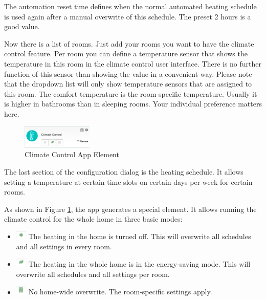 The automation reset time defines when the normal automated heating schedule is used 
again after a manual overwrite of this schedule. The preset 2 hours is a good value.

Now there is a list of rooms. Just add your rooms you want to have the climate control 
feature. Per room you can define a temperature sensor that shows the temperature in this 
room in the climate control user interface. There is no further function of this sensor 
than showing the value in a convenient way. Please note that the dropdown list will 
only show temperature sensors that are assigned to this room. The comfort temperature 
is the room-specific temperature. Usually it is higher in bathrooms than in sleeping 
rooms. Your individual preference matters here.


\begin{figure}
\begin{center}
\includegraphics[width=0.3\textwidth]{pngs/cap6/app27.png}
\caption{Climate Control App Element}
\label{app27}
\end{center}
\end{figure}

The last section of the configuration dialog is the heating schedule. It allows setting a 
temperature at certain time slots on certain days per week for certain rooms.

As shown in Figure \ref{app27}, the app generates a special element. It allows running the 
climate control for the whole home in three basic modes:

\begin{itemize}
\item \includegraphics[width=0.04\textwidth]{pngs/cap6/app27a.png} The heating in the home 
is turned off. This will overwrite all schedules and all settings in every room.
\item \includegraphics[width=0.04\textwidth]{pngs/cap6/app27b.png} The heating in the 
whole home is in the energy-saving mode. This will overwrite all schedules and all settings per room.
\item \includegraphics[width=0.04\textwidth]{pngs/cap6/app27c.png} No home-wide 
overwrite. The room-specific settings apply.
\end {itemize}

